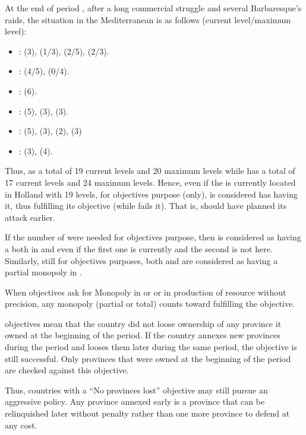 \begin{exemple}
  At the end of period , after a long commercial struggle
  and several Barbaresque's raids, the situation in the Mediterranean is
  as follows (current level/maximum level):
  \begin{itemize}
  \item {}: \HOL (3), \HIS (1/3), \VEN (2/5), \FRA (2/3).
  \item {}: \HOL(4/5), \VEN (0/4).
  \item {}: \VEN (6).
  \item {}: \TUR (5), \VEN (3), \HOL (3).
  \item {}: \HOL (5), \VEN (3), \TUR (2), \FRA (3)
  \item {}: \VEN (3), \HOL (4).
  \end{itemize}
  Thus, \HOL as a total of 19 current levels and 20 maximum levels while
  \VEN has a total of 17 current levels and 24 maximum levels. Hence,
  even if the  is currently located in Holland with 19
  levels, for objectives purpose (only), \VEN is considered has having
  it, thus fulfilling its objective (while \HOL fails it). That is, \HOL
  should have planned its attack earlier.

  If the number of \TradeFLEET were needed for objectives purpose, then
  \VEN is considered as having a \TradeFLEET\faceplus both in 
  and  even if the first one is currently \Facemoins and
  the second is not here. Similarly, still for objectives purposes, both
  \HOL and \VEN are considered as having a partial monopoly in
  .
\end{exemple}

 When objectives ask for Monopoly in \STZ
or \CTZ or in production of resource without precision, any monopoly
(partial or total) counts toward fulfilling the objective.

 objectives mean that the country did not loose
ownership of any province it owned at the beginning of the period.
\bparag If the country annexes new provinces during the period and
looses them later during the same period, the objective is still
successful. Only provinces that were owned at the beginning of the
period are checked against this objective.

\begin{designnote}
  Thus, countries with a ``No provinces lost'' objective may still
  pursue an aggressive policy. Any province annexed early is a province
  that can be relinquished later without penalty rather than one more
  province to defend at any cost.
\end{designnote}

